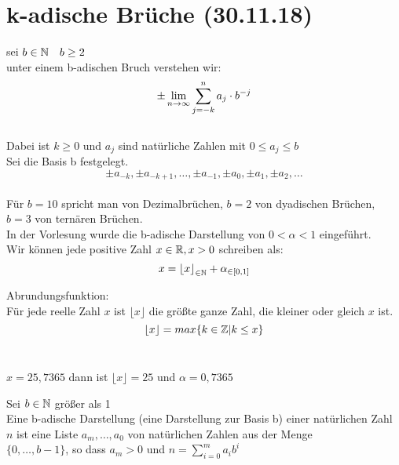 \documentclass[../ana1u.tex]{subfiles}
\begin{document}
\setcounter{section}{5}

\section{k-adische Brüche (30.11.18)}
\begin{bsp}
    sei \(b \in \mathbb{N} \quad b \geq 2\)\\
    unter einem b-adischen Bruch verstehen wir:\\
    \[\pm \lim\limits_{n\rightarrow\infty} \sum_{j=-k}^{n} a_j \cdot b^{-j}\]\\
    Dabei ist \(k \geq 0\) und \(a_j\) sind natürliche Zahlen mit \(0 \leq a_j \leq b\)\\
    Sei die Basis b festgelegt.\\
    \[\pm a_{-k}, \pm a_{-k+1}, \dots ,\pm a_{-1}, \pm a_0, \pm a_1, \pm a_2, \dots\]\\
    Für \(b = 10\) spricht man von Dezimalbrüchen, \(b = 2\) von dyadischen Brüchen, \(b = 3\) von ternären Brüchen.\\
    In der Vorlesung wurde die b-adische Darstellung von \(0 < \alpha < 1\) eingeführt. \\
    Wir können jede positive Zahl \(x \in \mathbb{R}, x > 0\) schreiben als:\\
    \[x = {\lfloor x \rfloor}_{\in \mathbb{N}} + \alpha_{\in [0, 1]} \]
\end{bsp}
\begin{defi}
    Abrundungsfunktion:\\
    Für jede reelle Zahl \(x\) ist \(\lfloor x \rfloor\) die größte ganze Zahl, die kleiner oder gleich \(x\) ist.\\
    \[\lfloor x \rfloor = max\{k \in \mathbb{Z} | k \leq x\}\]\\
    \begin{bsp}
        \(x = 25,7365\) dann ist \(\lfloor x \rfloor = 25\) und \(\alpha = 0,7365\)\\
    \end{bsp}
\end{defi}
\begin{defi}
    Sei \(b \in \mathbb{N}\) größer als 1\\
    Eine b-adische Darstellung (eine Darstellung zur Basis b) einer natürlichen Zahl \(n\) ist eine Liste \(a_m, \dots, a_0\) von natürlichen Zahlen aus der Menge\\
    \(\{0, \dots, b-1\}\), so dass \(a_m > 0\) und \(n = \sum_{i=0}^{m} a_ib^i\)
\end{defi}
\end{document}
